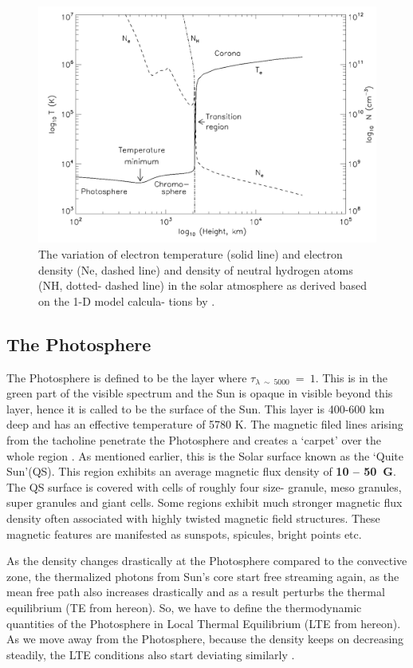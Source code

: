 \begin{figure}[h!]
    \centering
    \includegraphics[width = 0.8\linewidth]{Figures/solar_atm.png}
    \caption{The variation of electron temperature (solid line) and electron density (Ne, dashed line) and density of neutral hydrogen atoms (NH, dotted- dashed line) in the solar atmosphere as derived based on the 1-D model calcula- tions by .}
    \label{fig_solar_atm}
\end{figure}

\subsection{The Photosphere}\label{photosphere}

The Photosphere is defined to be the layer where $\tau_{\lambda~\sim~5000}~=~1$. This is in the green part of the visible spectrum and the Sun is opaque in visible beyond this layer, hence it is called to be the surface of the Sun. This layer is 400-600 km deep and has an effective temperature of 5780 K. The magnetic filed lines arising from the tacholine penetrate the Photosphere and creates a `carpet' over the whole region \citep{priest14}. As mentioned earlier, this is the Solar surface known as the `Quite Sun'(QS). This region exhibits an average magnetic flux density of \textbf{10 -- 50~G}. The QS surface is covered with cells of roughly four size- granule, meso granules, super granules and giant cells. Some regions exhibit much stronger magnetic flux density often associated with highly twisted magnetic field structures. These magnetic features are manifested as sunspots, spicules, bright points etc. 

As the density changes drastically at the Photosphere compared to the convective zone, the thermalized photons from Sun's core start free streaming again, as the mean free path also increases drastically and as a result perturbs the thermal equilibrium (TE from hereon). So, we have to define the thermodynamic quantities of the Photosphere in Local Thermal Equilibrium (LTE from hereon). As we move away from the Photosphere, because the density keeps on decreasing steadily, the LTE conditions also start deviating similarly \citep{philips08}.

